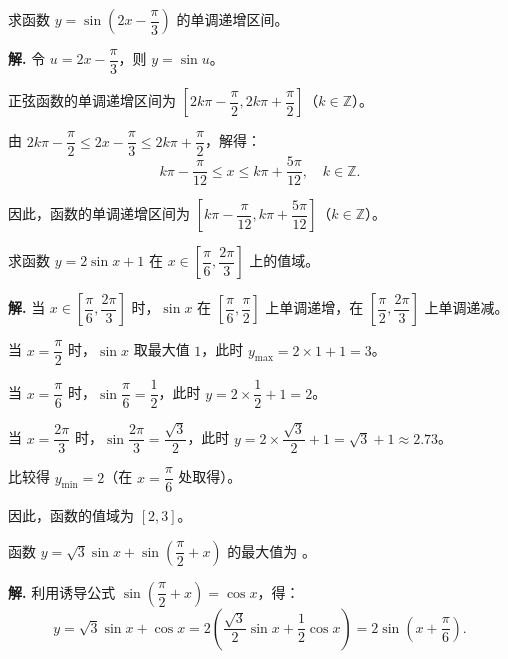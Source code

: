 \documentclass[11pt]{ctexrep}
\begin{document}
\begin{example}[求三角函数的单调区间]
    求函数 $y = \sin\left(2x - \dfrac{\pi}{3}\right)$ 的单调递增区间。
\end{example}

\textbf{解.} 令 $u = 2x - \dfrac{\pi}{3}$，则 $y = \sin u$。

正弦函数的单调递增区间为 $\left[2k\pi - \dfrac{\pi}{2}, 2k\pi + \dfrac{\pi}{2}\right]$（$k \in \mathbb{Z}$）。

由 $2k\pi - \dfrac{\pi}{2} \leqslant 2x - \dfrac{\pi}{3} \leqslant 2k\pi + \dfrac{\pi}{2}$，解得：
\[
    k\pi - \frac{\pi}{12} \leqslant x \leqslant k\pi + \frac{5\pi}{12}, \quad k \in \mathbb{Z}.
\]

因此，函数的单调递增区间为 $\left[k\pi - \dfrac{\pi}{12}, k\pi + \dfrac{5\pi}{12}\right]$（$k \in \mathbb{Z}$）。

\begin{example}[求三角函数的值域]
    求函数 $y = 2\sin x + 1$ 在 $x \in \left[\dfrac{\pi}{6}, \dfrac{2\pi}{3}\right]$ 上的值域。
\end{example}

\textbf{解.} 当 $x \in \left[\dfrac{\pi}{6}, \dfrac{2\pi}{3}\right]$ 时，$\sin x$ 在 $\left[\dfrac{\pi}{6}, \dfrac{\pi}{2}\right]$ 上单调递增，在 $\left[\dfrac{\pi}{2}, \dfrac{2\pi}{3}\right]$ 上单调递减。

当 $x = \dfrac{\pi}{2}$ 时，$\sin x$ 取最大值 $1$，此时 $y_{\max} = 2 \times 1 + 1 = 3$。

当 $x = \dfrac{\pi}{6}$ 时，$\sin\dfrac{\pi}{6} = \dfrac{1}{2}$，此时 $y = 2 \times \dfrac{1}{2} + 1 = 2$。

当 $x = \dfrac{2\pi}{3}$ 时，$\sin\dfrac{2\pi}{3} = \dfrac{\sqrt{3}}{2}$，此时 $y = 2 \times \dfrac{\sqrt{3}}{2} + 1 = \sqrt{3} + 1 \approx 2.73$。

比较得 $y_{\min} = 2$（在 $x = \dfrac{\pi}{6}$ 处取得）。

因此，函数的值域为 $[2, 3]$。

\begin{realexam}[2025 黄浦高三二模]
    函数 $y = \sqrt{3}\sin x + \sin\left(\dfrac{\pi}{2} + x\right)$ 的最大值为 \underline{\hspace{2cm}}。
\end{realexam}

\textbf{解.} 利用诱导公式 $\sin\left(\dfrac{\pi}{2} + x\right) = \cos x$，得：
\[
    y = \sqrt{3}\sin x + \cos x = 2\left(\frac{\sqrt{3}}{2}\sin x + \frac{1}{2}\cos x\right) = 2\sin\left(x + \frac{\pi}{6}\right).
\]
\end{document}
